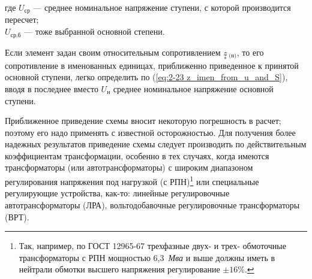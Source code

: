 где $ U_{\text{ср}} $ --- среднее номинальное напряжение ступени, с которой производится пересчет;\\
$ U_{\text{ср.б}} $ --- тоже выбранной основной степени.

Если элемент задан своим относительным сопротивлением $ \underset{*}{z}\!\,_{\text{(н)}} $, то его сопротивление в именованных единицах, приближенно приведенное к принятой основной ступени, легко определить по (\ref{eq:2-23 z_imen_from_u_and_S}), вводя в последнее вместо $ U_{\text{н}} $ среднее номинальное напряжение основной ступени.

Приближенное приведение схемы вносит некоторую погрешность в расчет; поэтому его надо применять с известной осторожностью. Для получения более надежных результатов приведение схемы следует производить по действительным коэффициентам трансформации, особенно в тех случаях, когда имеются трансформаторы (или автотрансформаторы) с широким диапазоном регулирования напряжения под нагрузкой (с РПН)\footnote{Так, например, по ГОСТ 12965-67 трехфазные двух- и трех- обмоточные трансформаторы с РПН мощностью 6,3~\textit{Мва} и выше должны иметь в нейтрали обмотки высшего напряжения регулирование $ \pm16\% $.} или специальные регулирующие устройства, как-то: линейные регулировочные автотрансформаторы (ЛРА), вольтодобавочные регулировочные трансформаторы (ВРТ).

